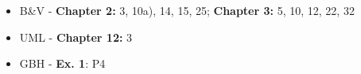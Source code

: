 \documentclass{article}
\begin{document}
\begin{itemize}
    \item B\&V \cite{boyd2004convex} - \textbf{Chapter 2:} 3, 10a), 14, 15, 25; \textbf{Chapter 3:} 5, 10, 12, 22, 32
    \item UML \cite{Shalev-Shwartz:2014:UML:2621980} - \textbf{Chapter 12:} 3
    \item GBH \cite{Gower} - \textbf{Ex. 1}: P4
\end{itemize}




\end{document}
